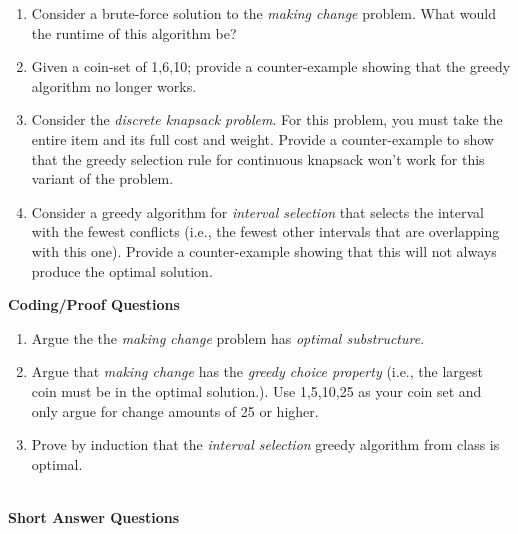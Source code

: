 \documentclass[10pt]{article}
\newcounter{pagenum}
\newcommand{\pageheader}[1]{
\clearpage\vspace*{-0.4in}\noindent{\large\bf{{#1}}}
\addtocounter{pagenum}{1}
\cfoot{}
}
\begin{document}
\begin{enumerate}
	\setlength\itemsep{0.25em}
	\item Consider a brute-force solution to the \emph{making change} problem. What would the runtime of this algorithm be?
	\item Given a coin-set of 1,6,10; provide a counter-example showing that the greedy algorithm no longer works.
	\item Consider the \emph{discrete knapsack problem}. For this problem, you must take the entire item and its full cost and weight. Provide a counter-example to show that the greedy selection rule for continuous knapsack won't work for this variant of the problem.
	\item Consider a greedy algorithm for \emph{interval selection} that selects the interval with the fewest conflicts (i.e., the fewest other intervals that are overlapping with this one). Provide a counter-example showing that this will not always produce the optimal solution.
\end{enumerate}

\vspace{0.5in}

\textbf{Coding/Proof Questions}
\begin{enumerate}
	\setlength\itemsep{0.25em}
	\item Argue the the \emph{making change} problem has \emph{optimal substructure}.
	\item Argue that \emph{making change} has the \emph{greedy choice property} (i.e., the largest coin must be in the optimal solution.). Use 1,5,10,25 as your coin set and only argue for change amounts of 25 or higher.
	\item Prove by induction that the \emph{interval selection} greedy algorithm from class is optimal.
\end{enumerate}



\pageheader{Divide and Conquer: Basic}

\noindent \\
\textbf{Short Answer Questions}
\end{document}
